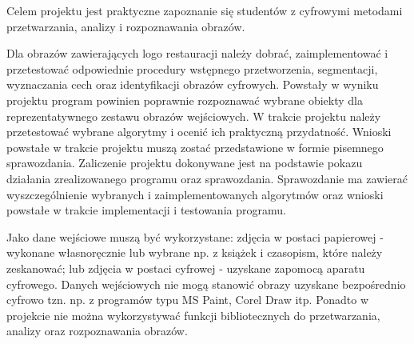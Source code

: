 Celem projektu jest praktyczne zapoznanie się studentów z cyfrowymi metodami przetwarzania, analizy i rozpoznawania obrazów. 

Dla obrazów zawierających logo restauracji \bk należy dobrać, zaimplementować i przetestować odpowiednie procedury wstępnego przetworzenia, segmentacji, wyznaczania cech oraz identyfikacji obrazów cyfrowych. Powstały w wyniku projektu program powinien poprawnie rozpoznawać wybrane obiekty dla reprezentatywnego zestawu obrazów wejściowych. W trakcie projektu należy przetestować wybrane algorytmy i ocenić ich praktyczną przydatność. Wnioski powstałe w trakcie projektu muszą zostać przedstawione w formie pisemnego sprawozdania. Zaliczenie projektu dokonywane jest na podstawie pokazu działania zrealizowanego programu oraz sprawozdania. Sprawozdanie ma zawierać wyszczególnienie wybranych i zaimplementowanych algorytmów oraz wnioski powstałe w trakcie implementacji i testowania programu.

Jako dane wejściowe muszą być wykorzystane: zdjęcia w postaci papierowej - wykonane własnoręcznie lub wybrane np. z książek i czasopism, które należy zeskanować; lub zdjęcia w postaci cyfrowej - uzyskane zapomocą aparatu cyfrowego. Danych wejściowych nie mogą stanowić obrazy uzyskane bezpośrednio cyfrowo tzn. np. z programów typu MS Paint, Corel Draw itp. Ponadto w projekcie nie można wykorzystywać funkcji bibliotecznych do przetwarzania, analizy oraz rozpoznawania obrazów.
